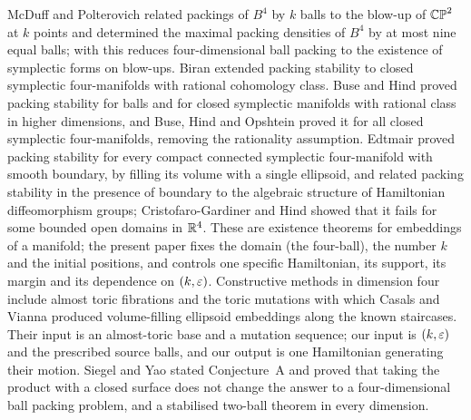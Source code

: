 McDuff and Polterovich \cite{McDuffPolterovich1994} related packings of $B^4$ by $k$ balls to the blow-up of
$\mathbb{CP}^2$ at $k$ points and determined the maximal packing densities of $B^4$ by at most nine equal balls; with
\cite{McDuff1991} this reduces four-dimensional ball packing to the existence of symplectic forms on blow-ups.
Biran \cite{Biran1999} extended packing stability to closed symplectic four-manifolds with rational
cohomology class. Buse and Hind \cite{BuseHind2011,BuseHind2013} proved packing stability for balls and for closed
symplectic manifolds with rational class in higher dimensions, and Buse, Hind and Opshtein
\cite{BuseHindOpshtein2016} proved it for all closed symplectic four-manifolds, removing the rationality
assumption. Edtmair \cite{Edtmair2025} proved packing stability for every compact connected symplectic four-manifold
with smooth boundary, by filling its volume with a single ellipsoid, and related packing stability in the presence of
boundary to the algebraic structure of Hamiltonian diffeomorphism groups; Cristofaro-Gardiner and Hind
\cite{CristofaroGardinerHind2023} showed that it fails for some bounded open domains in $\mathbb{R}^4$. These are existence
theorems for embeddings of a manifold; the present paper fixes the domain (the four-ball), the number $k$ and the
initial positions, and controls one specific Hamiltonian, its support, its margin and its dependence on $(k,\varepsilon)$.
Constructive methods in dimension four include almost toric fibrations \cite{Symington2003} and the toric mutations
with which Casals and Vianna \cite{CasalsVianna2020} produced volume-filling ellipsoid embeddings along the known
staircases. Their input is an almost-toric base and a mutation sequence; our input is $(k,\varepsilon)$ and the prescribed
source balls, and our output is one Hamiltonian generating their motion.
Siegel and Yao \cite{SiegelYao2025} stated Conjecture~A and proved that taking the product with a closed surface
does not change the answer to a four-dimensional ball packing problem, and a stabilised two-ball theorem in every
dimension.

